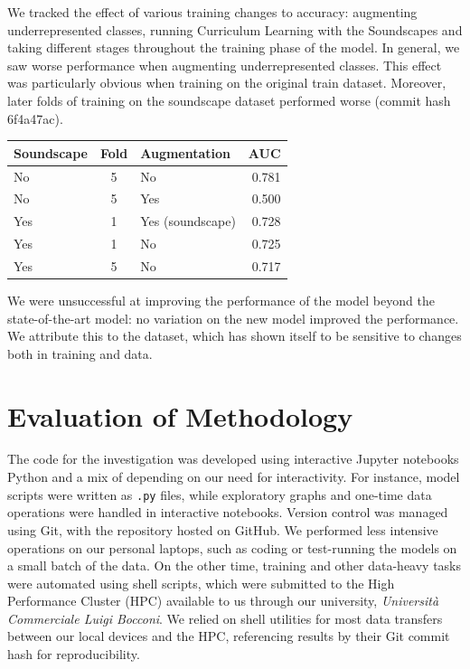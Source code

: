 \documentclass[11pt]{article}
\begin{document}
\begin{minipage}{0.48\linewidth}
  We tracked the effect of various training changes to accuracy: augmenting underrepresented classes, running Curriculum Learning \cite{curriculum_learning} with the Soundscapes and taking different stages throughout the training phase of the model. In general, we saw worse performance when augmenting underrepresented classes. This effect was particularly obvious when training on the original train dataset. Moreover, later folds of training on the soundscape dataset performed worse (commit hash 6f4a47ac).
\end{minipage}
\hfill
\begin{minipage}{0.48\linewidth}
  \centering
  \begin{tabular}{|l|c|l|r|}
    \hline
    \textbf{Soundscape} & \textbf{Fold} & \textbf{Augmentation} & \textbf{AUC} \\
    \hline
    No         & 5    & No               & 0.781 \\
    No         & 5    & Yes              & 0.500 \\
    Yes        & 1    & Yes (soundscape) & 0.728 \\
    Yes        & 1    & No               & 0.725 \\
    Yes        & 5    & No               & 0.717 \\
    \hline
  \end{tabular}
\end{minipage}

We were unsuccessful at improving the performance of the model beyond the state-of-the-art model: no variation on the new model improved the performance. We attribute this to the dataset, which has shown itself to be sensitive to changes both in training and data.

\section*{Evaluation of Methodology}

The code for the investigation was developed using interactive Jupyter notebooks Python and a mix of depending on our need for interactivity. For instance, model scripts were written as \texttt{.py} files, while exploratory graphs and one-time data operations were handled in interactive notebooks. Version control was managed using Git, with the repository hosted on GitHub.  We performed less intensive operations on our personal laptops, such as coding or test-running the models on a small batch of the data. On the other time, training and other data-heavy tasks were automated using shell scripts, which were submitted to the High Performance Cluster (HPC) available to us through our university, \textit{Università Commerciale Luigi Bocconi}\cite{unibocconi}. We relied on shell utilities for most data transfers between our local devices and the HPC, referencing results by their Git commit hash for reproducibility.
\end{document}
